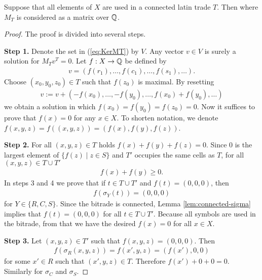 \begin{lem}
Suppose that all elements of $X$ are used in a connected latin trade $T$. Then
%
where $M_T$ is considered as a matrix over $\mathbb Q$.
\end{lem}
\begin{proof}
The proof is divided into several steps.

%
%
\item \textbf{Step 1.}
Denote the set in (\ref{eq:KerMT}) by $V$. Any vector $v \in V$ is surely a solution for $M_Tv^T = 0$. Let $f:X \rightarrow \mathbb Q$ be defined by
\begin{align}
	v = (f(r_1), \dots, f(c_1), \dots, f(s_1), \dots).
\end{align}
Choose $(x_0, y_0, z_0) \in T$ such that $f(z_0)$ is maximal. By resetting
\begin{align}
	v := v+(-f(x_0), \dots, -f(y_0), \dots,f(x_0)+f(y_0), \dots)
\end{align}
we obtain a solution in which $f(x_0) = f(y_0) = f(z_0) = 0$. Now it suffices to prove that $f(x) = 0$ for any $x \in X$. To shorten notation, we denote $f(x,y,z) = f((x,y,z)) = (f(x),f(y),f(z))$.

%
%
\item \textbf{Step 2.}
For all $(x,y,z) \in T$ holds $f(x)+f(y)+f(z)=0$. Since $0$ is the largest element of $\{f(z) \mid z \in S\}$ and $T'$ occupies the same cells as $T$, for all $(x,y,z) \in T \cup T'$
\begin{align}
	f(x) + f(y) \geq 0.
\end{align}
In steps 3 and 4 we prove that if $t \in T\cup T'$ and $f(t) = (0,0,0)$, then
\begin{align}
	f(\sigma_Y(t)) = (0,0,0)
\end{align}
for $Y \in \{R, C, S\}$. Since the bitrade is connected, Lemma \ref{lem:connected-sigma} implies that $f(t) = (0,0,0)$ for all $t \in T \cup T'$. Because all symbols are used in the bitrade, from that we have the desired $f(x) = 0$ for all $x \in X$.

%
%
\item \textbf{Step 3.}
Let $(x,y,z) \in T'$ such that $f(x,y,z) = (0,0,0)$. Then
\begin{align}
	f(\sigma_R(x,y,z)) = f(x',y,z) = (f(x'), 0, 0)
\end{align}
for some $x' \in R$ such that $(x',y,z) \in T$. Therefore $f(x') + 0 + 0 = 0$. Similarly for $\sigma_C$ and $\sigma_S$.


\end{proof}
